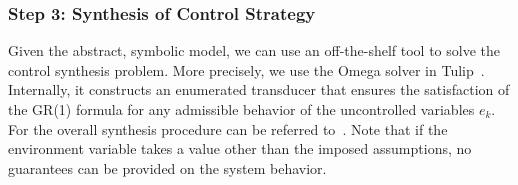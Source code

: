 \documentclass[letterpaper, 10 pt, conference]{ieeeconf}
\begin{document}



\subsubsection{Step 3: Synthesis of  Control Strategy}
Given the abstract, symbolic model, we can use an off-the-shelf tool to solve the control synthesis problem. More precisely, we use the Omega solver \cite{filippidis2016symbolic}
in Tulip~\cite{wongpiromsarn2011tulip,tulip2016}. Internally, it constructs an enumerated transducer that ensures the satisfaction of the GR(1) formula for any admissible behavior of the uncontrolled variables $e_k$. For the overall synthesis procedure can be referred to~\cite{BLOEM2012911, tulip2016}. Note that if the environment variable takes a value other than the imposed assumptions, no guarantees can be provided on the system behavior. 
\end{document}
